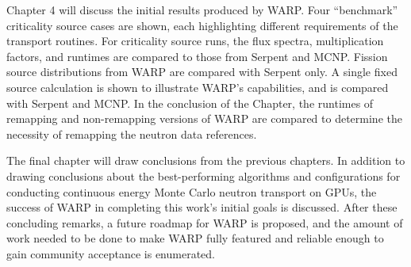 Chapter 4 will discuss the initial results produced by WARP.  Four ``benchmark'' criticality source cases are shown, each highlighting different requirements of the transport routines.  For criticality source runs, the flux spectra, multiplication factors, and runtimes are compared to those from Serpent and MCNP.  Fission source distributions from WARP are compared with Serpent only.  A single fixed source calculation is shown to illustrate WARP's capabilities, and is compared with Serpent and MCNP.  In the conclusion of the Chapter, the runtimes of remapping and non-remapping versions of WARP are compared to determine the necessity of remapping the neutron data references.

The final chapter will draw conclusions from the previous chapters.  In addition to drawing conclusions about the best-performing algorithms and configurations for conducting continuous energy Monte Carlo neutron transport on GPUs, the success of WARP in completing this work's initial goals is discussed.  After these concluding remarks, a future roadmap for WARP is proposed, and the amount of work needed to be done to make WARP fully featured and reliable enough to gain community acceptance is enumerated.






